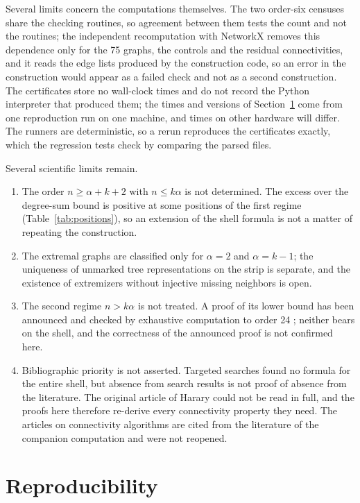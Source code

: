 Several limits concern the computations themselves.
The two order-six censuses share the checking routines, so agreement between them tests the count and not the routines; the independent recomputation with NetworkX removes this dependence only for the 75 graphs, the controls and the residual connectivities, and it reads the edge lists produced by the construction code, so an error in the construction would appear as a failed check and not as a second construction.
The certificates store no wall-clock times and do not record the Python interpreter that produced them; the times and versions of Section~\ref{sec:repro} come from one reproduction run on one machine, and times on other hardware will differ.
The runners are deterministic, so a rerun reproduces the certificates exactly, which the regression tests check by comparing the parsed files.

Several scientific limits remain.
\begin{enumerate}
\item The order $n\ge\alpha+k+2$ with $n\le k\alpha$ is not determined.
The excess over the degree-sum bound is positive at some positions of the first regime (Table~\ref{tab:positions}), so an extension of the shell formula is not a matter of repeating the construction.
\item The extremal graphs are classified only for $\alpha=2$ and $\alpha=k-1$; the uniqueness of unmarked tree representations on the strip is separate, and the existence of extremizers without injective missing neighbors is open.
\item The second regime $n>k\alpha$ is not treated.
A proof of its lower bound has been announced \cite{Didin,DidinMalyshev} and checked by exhaustive computation to order 24 \cite{Second}; neither bears on the shell, and the correctness of the announced proof is not confirmed here.
\item Bibliographic priority is not asserted.
Targeted searches found no formula for the entire shell, but absence from search results is not proof of absence from the literature.
The original article of Harary \cite{Harary} could not be read in full, and the proofs here therefore re-derive every connectivity property they need.
The articles on connectivity algorithms \cite{EvenTarjan,EsfahanianHakimi} are cited from the literature of the companion computation and were not reopened.
\end{enumerate}

\section{Reproducibility}\label{sec:repro}

